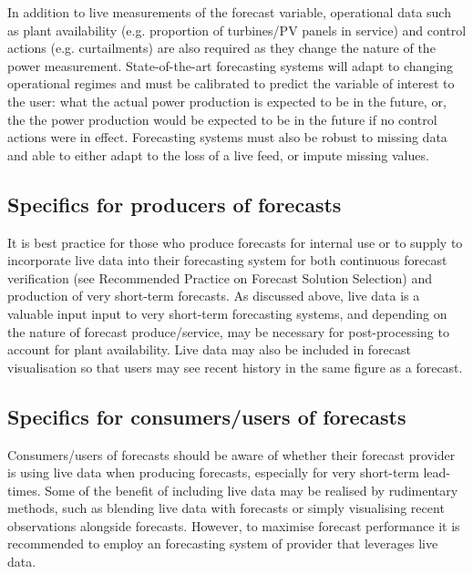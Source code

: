 In addition to live measurements of the forecast variable, operational data such as plant availability (e.g. proportion of turbines/PV panels in service) and control actions (e.g. curtailments) are also required as they change the nature of the power measurement. State-of-the-art forecasting systems will adapt to changing operational regimes and must be calibrated to predict the variable of interest to the user: what the actual power production is expected to be in the future, or, the the power production would be expected to be in the future if no control actions were in effect.  Forecasting systems must also be robust to missing data and able to either adapt to the loss of a live feed, or impute missing values.



{\color{magenta}{JB to make illustration/example figure here.}}

\subsection{Specifics for producers of forecasts}
\label{sec:live-data-producer}

It is best practice for those who produce forecasts for internal use or to supply to  incorporate live data into their forecasting system for both continuous forecast verification (see Recommended Practice on Forecast Solution Selection) and production of very short-term forecasts. As discussed above, live data is a valuable input input to very short-term forecasting systems, and depending on the nature of forecast produce/service, may be necessary for post-processing to account for plant availability. Live data may also be included in forecast visualisation so that users may see recent history in the same figure as a forecast.


\subsection{Specifics for consumers/users of forecasts} 
\label{sec:liva-data-so}

Consumers/users of forecasts should be aware of whether their forecast provider is using live data when producing forecasts, especially for very short-term lead-times. Some of the benefit of including live data may be realised by rudimentary methods, such as blending live data with forecasts or simply visualising recent observations alongside forecasts. However, to maximise forecast performance it is recommended to employ an forecasting system of provider that leverages live data.